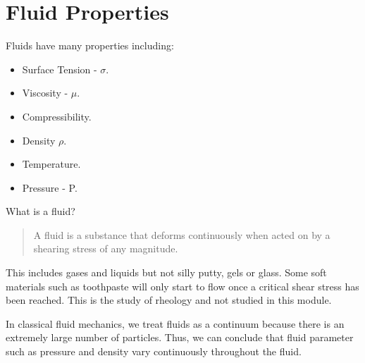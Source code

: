\documentclass[class=report, crop=false, 12pt,a4paper]{standalone}
\begin{document}
\section{Fluid Properties}
Fluids have many properties including:

\begin{multicols}{2}
  \begin{itemize}[noitemsep]
    \item Surface Tension - \( \sigma \).
    \item Viscosity - \( \mu \).
    \item Compressibility.
    \item Density \( \rho \).
    \item Temperature.
    \item Pressure - P.
  \end{itemize}
\end{multicols}

What is a fluid?
\begin{quote}
  \begin{center}
    A fluid is a substance that deforms continuously when acted on by a shearing stress of any magnitude. 
  \end{center}
\end{quote}
This includes gases and liquids but not silly putty, gels or glass. Some soft materials such as toothpaste will only start to flow once a critical shear stress has been reached. This is the study of rheology and not studied in this module.

In classical fluid mechanics, we treat fluids as a continuum because there is an extremely large number of particles. Thus, we can conclude that fluid parameter such as pressure and density vary continuously throughout the fluid.
\end{document}
